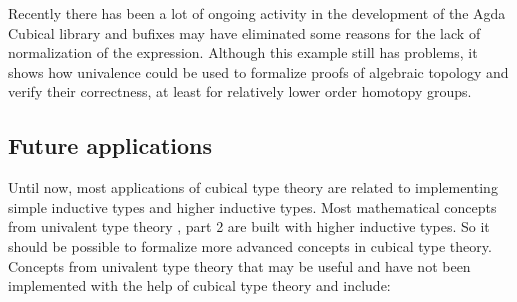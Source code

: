 \documentclass[12pt,a4paper,twoside,xetex,draft]{book}
\begin{document}
Recently there has been a lot of ongoing activity in the development of the Agda Cubical library and bufixes may have eliminated some reasons for the lack of normalization of the expression. Although this example still has problems, it shows how univalence could be used to formalize proofs of algebraic topology and verify their correctness, at least for relatively lower order homotopy groups.

\subsection{Future applications}

Until now, most applications of cubical type theory are related to implementing simple inductive types and higher inductive types. Most mathematical concepts from univalent type theory \cite{Voevodsky2013}, part 2 are built with higher inductive types. So it should be possible to formalize more advanced concepts in cubical type theory. Concepts from univalent type theory that may be useful and have not been implemented with the help of cubical type theory and \cite{Moertberg2018} include:
\end{document}
